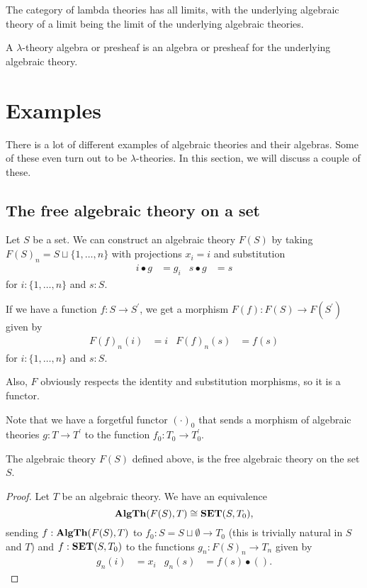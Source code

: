 \begin{remark}
  The category of lambda theories has all limits, with the underlying algebraic theory of a limit being the limit of the underlying algebraic theories.
\end{remark}

\begin{definition}
  A $ \lambda $-theory algebra or presheaf is an algebra or presheaf for the underlying algebraic theory.
\end{definition}

\section{Examples}

There is a lot of different examples of algebraic theories and their algebras. Some of these even turn out to be $ \lambda $-theories. In this section, we will discuss a couple of these.

\subsection{The free algebraic theory on a set}
\begin{example}
  Let $ S $ be a set. We can construct an algebraic theory $ F(S) $ by taking $ F(S)_n = S \sqcup \{ 1, \dots, n \} $ with projections $ x_i = i $ and substitution
  \begin{align*}
    i \bullet g &= g_i & s \bullet g &= s
  \end{align*}
  for $ i : \{ 1, \dots, n \} $ and $ s : S $.

  If we have a function $ f: S \to S^\prime $, we get a morphism $ F(f): F(S) \to F(S^\prime) $ given by
  \begin{align*}
    F(f)_n(i) &= i & F(f)_n(s) &= f(s)
  \end{align*}
  for $ i : \{ 1, \dots, n \} $ and $ s : S $.

  Also, $ F $ obviously respects the identity and substitution morphisms, so it is a functor.
\end{example}

Note that we have a forgetful functor $ (\cdot)_0 $ that sends a morphism of algebraic theories $ g: T \to T^\prime $ to the function $ f_0: T_0 \to T^\prime_0 $.

\begin{lemma}
  The algebraic theory $ F(S) $ defined above, is the free algebraic theory on the set $ S $.
\end{lemma}
\begin{proof}
  Let $ T $ be an algebraic theory. We have an equivalence
  \[ \mathbf{AlgTh}(F(S), T) \cong \mathbf{SET}(S, T_0), \]
  sending $ f: \mathbf{AlgTh}(F(S), T) $ to $ f_0: S = S \sqcup \emptyset \to T_0 $ (this is trivially natural in $ S $ and $ T $) and $ f: \mathbf{SET}(S, T_0) $ to the functions $ g_n: F(S)_n \to T_n $ given by
  \begin{align*}
    g_n(i) &= x_i & g_n(s) &= f(s) \bullet ().
  \end{align*}
\end{proof}

